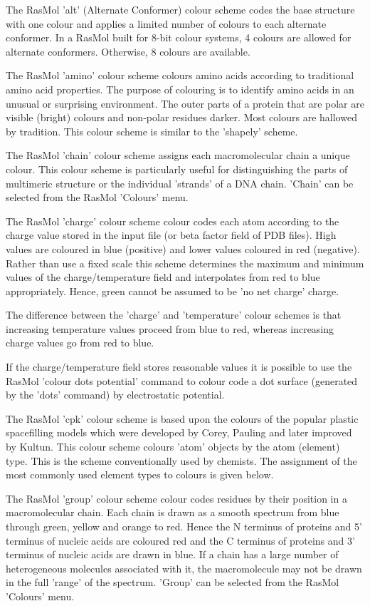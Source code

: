 The RasMol
'alt'
(Alternate Conformer)
colour scheme codes the base
structure with one colour and applies a limited number of colours to each
alternate conformer.  In a RasMol built for 8-bit colour systems, 4 colours
are allowed for alternate conformers. Otherwise, 8 colours are available.

The RasMol
'amino'
colour scheme colours amino acids according to traditional amino acid
properties. The purpose of colouring is to identify amino acids in an
unusual or surprising environment. The outer parts of a protein that are
polar are visible (bright) colours and non-polar residues darker. Most
colours are hallowed by tradition. This colour scheme is similar to the
'shapely'
scheme.

The RasMol
'chain'
colour scheme assigns each macromolecular chain a unique colour. This
colour scheme is particularly useful for distinguishing the parts of
multimeric structure or the individual 'strands' of a DNA chain.
'Chain'
can be selected from the RasMol
'Colours'
menu.

The RasMol
'charge'
colour scheme colour codes each atom according to the charge value
stored in the input file (or beta factor field of PDB files). High
values are coloured in blue (positive) and lower values coloured in
red (negative). Rather than use a fixed scale this scheme determines
the maximum and minimum values of the charge/temperature field and
interpolates from red to blue appropriately. Hence, green cannot be
assumed to be 'no net charge' charge.

The difference between the
'charge'
and
'temperature'
colour schemes is that increasing temperature values proceed from blue
to red, whereas increasing charge values go from red to blue.

If the charge/temperature field stores reasonable values it is possible
to use the RasMol
'colour dots potential'
command to colour code a dot surface (generated by the
'dots'
command) by electrostatic potential.

The RasMol
'cpk'
colour scheme is based upon the colours of the popular plastic
spacefilling models which were developed by Corey, Pauling and later
improved by Kultun. This colour scheme colours 'atom' objects by the
atom (element) type. This is the scheme conventionally used by chemists.
The assignment of the most commonly used element types to colours is
given below.

The RasMol
'group'
colour scheme colour codes residues by their position in a macromolecular
chain. Each chain is drawn as a smooth spectrum from blue through green,
yellow and orange to red. Hence the N terminus of proteins and 5' terminus
of nucleic acids are coloured red and the C terminus of proteins and 3'
terminus of nucleic acids are drawn in blue. If a chain has a large number
of heterogeneous molecules associated with it, the macromolecule may not be
drawn in the full 'range' of the spectrum.
'Group'
can be selected from the RasMol
'Colours'
menu.

